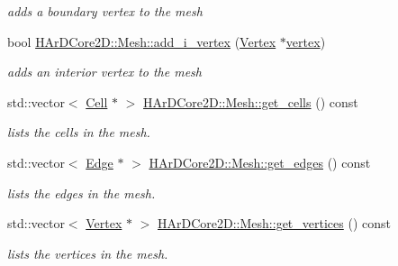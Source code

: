 \begin{DoxyCompactItemize}
\begin{DoxyCompactList}\small\item\em adds a boundary vertex to the mesh \end{DoxyCompactList}\item 
\mbox{\label{group__Mesh_gae0eac0c28f63b2106e97e595cb95248e}} 
bool \hyperlink{group__Mesh_gae0eac0c28f63b2106e97e595cb95248e}{H\+Ar\+D\+Core2\+D\+::\+Mesh\+::add\+\_\+i\+\_\+vertex} (\hyperlink{classHArDCore2D_1_1Vertex}{Vertex} $\ast$\hyperlink{classHArDCore2D_1_1Mesh_ad099224c697c05a57fad6a47fdcd9e76}{vertex})
\begin{DoxyCompactList}\small\item\em adds an interior vertex to the mesh \end{DoxyCompactList}\item 
\mbox{\label{group__Mesh_gabae9df200fe23a302b3d01e4ff13f921}} 
std\+::vector$<$ \hyperlink{classHArDCore2D_1_1Cell}{Cell} $\ast$ $>$ \hyperlink{group__Mesh_gabae9df200fe23a302b3d01e4ff13f921}{H\+Ar\+D\+Core2\+D\+::\+Mesh\+::get\+\_\+cells} () const
\begin{DoxyCompactList}\small\item\em lists the cells in the mesh. \end{DoxyCompactList}\item 
\mbox{\label{group__Mesh_ga9a2d7a3f9f870455465e1a9204ee3d53}} 
std\+::vector$<$ \hyperlink{classHArDCore2D_1_1Edge}{Edge} $\ast$ $>$ \hyperlink{group__Mesh_ga9a2d7a3f9f870455465e1a9204ee3d53}{H\+Ar\+D\+Core2\+D\+::\+Mesh\+::get\+\_\+edges} () const
\begin{DoxyCompactList}\small\item\em lists the edges in the mesh. \end{DoxyCompactList}\item 
\mbox{\label{group__Mesh_ga3ef9f9e205077bdb5c1057602bde5d70}} 
std\+::vector$<$ \hyperlink{classHArDCore2D_1_1Vertex}{Vertex} $\ast$ $>$ \hyperlink{group__Mesh_ga3ef9f9e205077bdb5c1057602bde5d70}{H\+Ar\+D\+Core2\+D\+::\+Mesh\+::get\+\_\+vertices} () const
\begin{DoxyCompactList}\small\item\em lists the vertices in the mesh. \end{DoxyCompactList}\item 

\end{DoxyCompactItemize}
